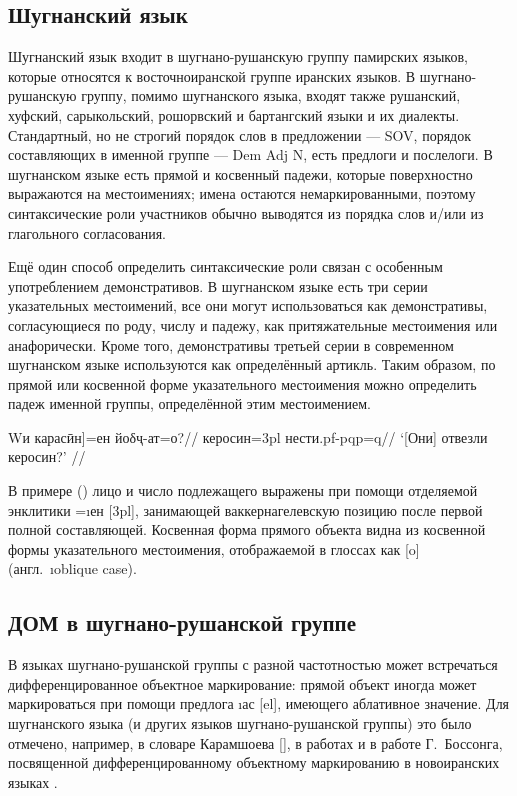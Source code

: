 \subsection{Шугнанский язык} \label{dom-shughni}

Шугнанский язык входит в шугнано-рушанскую группу памирских языков, которые относятся к восточноиранской группе иранских языков. В шугнано-рушанскую группу, помимо шугнанского языка, входят также рушанский, хуфский, сарыкольский, рошорвский и бартангский языки и их диалекты. Стандартный, но не строгий порядок слов в предложении — SOV, порядок составляющих в именной группе — {\sc Dem} {\sc Adj} N, есть предлоги и послелоги. В шугнанском языке есть прямой и косвенный падежи, которые поверхностно выражаются на местоимениях; имена остаются немаркированными, поэтому синтаксические роли участников обычно выводятся из порядка слов и/или из глагольного согласования.

Ещё один способ определить синтаксические роли связан с особенным употреблением демонстративов. В шугнанском языке есть три серии указательных местоимений, все они могут использоваться как демонстративы, согласующиеся по роду, числу и падежу, как притяжательные местоимения или анафорически. Кроме того, демонстративы третьей серии в современном шугнанском языке используются как определённый артикль. Таким образом, по прямой или косвенной форме указательного местоимения можно определить падеж именной группы, определённой этим местоимением.

\begingl
\gla {[}Wи карасӣн{]}=ен йоδҷ-ат=о?//
 керосин={\sc 3pl} нести.{\sc pf-pqp=q}//
\glft ‘[Они] отвезли керосин?’ //
\endgl \xe

В примере () лицо и число подлежащего выражены при помощи отделяемой энклитики =\i{ен} [{\sc 3pl}], занимающей ваккернагелевскую позицию после первой полной составляющей. Косвенная форма прямого объекта видна из косвенной формы указательного местоимения, отображаемой в глоссах как [{\sc o}] (англ.~\i{oblique case}).

\subsection{ДОМ в шугнано-рушанской группе} \label{dom-dom}

В языках шугнано-рушанской группы с разной частотностью может встречаться дифференцированное объектное маркирование: прямой объект иногда может маркироваться при помощи предлога \i{ас} [{\sc el}], имеющего аблативное значение. Для шугнанского языка (и других языков шугнано-рушанской группы) это было отмечено, например, в словаре Карамшоева [\cite*[137]{karamshoev1988}], в работах \parencites[43]{pakhalina1969_pamir}[804]{edelman_dodykhudoeva2009_shughni} и в работе Г.~Боссонга, посвященной дифференцированному объектному маркированию в новоиранских языках \parencite[98–103]{bossong1985}.

